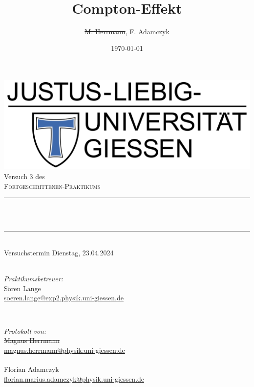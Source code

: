 \documentclass[12pt,a4paper,ngerman]{report}
\title{Compton-Effekt}			%
\author{\st{M. Herrmann}, F. Adamczyk}
\date{\today}
\makeatletter
\let\thetitle\@title
\makeatother
\begin{document}

	\begin{titlepage}
		\centering
		\vspace*{0.5 cm}
		\includegraphics[width = 0.6 \textwidth]{JLU_Giessen-Logo}	%
		\\[2.0 cm]
		Versuch 3 des\\
		\textsc{\Large  Fortgeschrittenen-Praktikums}\\ [0.3 cm]				%
		\rule{\linewidth}{0.2 mm} \\[0.4 cm]
		{ \huge \bfseries \thetitle}\\%
		\rule{\linewidth}{0.2 mm}\\
	  Versuchstermin Dienstag, 23.04.2024 \\
		~ \\
		[2.0 cm]


		\begin{minipage}{0.49\textwidth}
			\begin{flushleft}
				\emph{Praktikumsbetreuer:}\\
				Sören Lange\\
				\small{\href{mailto:soeren.lange@exp2.physik.uni-giessen.de}{soeren.lange@exp2.physik.uni-giessen.de}}
			\end{flushleft}
		\end{minipage}~
		\begin{minipage}{0.49\textwidth}
			\begin{flushright}
				\emph{Protokoll von:} \\

				\large{\st{Magnus Herrmann}}\\
				\small{\href{mailto:Magnus.Herrmann@physik.uni-giessen.de}{\st{magnus.herrmann@physik.uni-giessen.de}}\\~\\
    }
				\large{Florian Adamczyk} \\
				\small{\href{mailto:florian.marius.adamczyk@physik.uni-giessen.de}{florian.marius.adamczyk@physik.uni-giessen.de}\\
      }
			\end{flushright}
		\end{minipage}


\end{titlepage}
\end{document}

